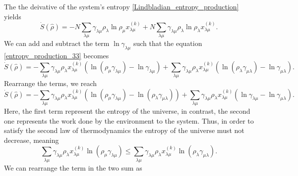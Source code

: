 The the deivative of the system's entropy \eqref{Lindbladian_entropy_production} yields 
\begin{equation}\label{entropy_production_33}
    \dot S(\hat\rho) = -N \sum_{\lambda\mu}\gamma_{\lambda\mu}\rho_\lambda\ln\rho_\mu x^{(k)}_{\lambda\mu} + N\sum_{\lambda\mu}\gamma_{\lambda\mu}\rho_\lambda\ln\rho_\lambda x^{(k)}_{\lambda\mu}.
\end{equation}
We can add and subtract the term $\ln\gamma_{\lambda\mu}$ such that the equation \eqref{entropy_production_33} becomes
\begin{equation}
    \dot S(\hat\rho) = -\sum_{\lambda\mu}\gamma_{\lambda\mu}\rho_\lambda x^{(k)}_{\lambda\mu}\left(\ln\left(\rho_\mu\gamma_{\lambda\mu}\right) - \ln\gamma_{\lambda\mu}\right)  
    + \sum_{\lambda\mu}\gamma_{\lambda\mu}\rho_\lambda x^{(k)}_{\lambda\mu}\left(\ln\left(\rho_\lambda\gamma_{\mu\lambda}\right)- \ln\gamma_{\mu\lambda}\right) .
\end{equation}
Rearrange the terms, we reach
\begin{equation}
    \dot S(\hat\rho) =-\sum_{\lambda\mu}\gamma_{\lambda\mu}\rho_\lambda x^{(k)}_{\lambda\mu}\left(\ln\left(\rho_\mu\gamma_{\lambda\mu}\right) - \ln\left(\rho_\lambda\gamma_{\mu\lambda}\right)\right) + \sum_{\lambda\mu}\gamma_{\lambda\mu}\rho_\lambda x^{(k)}_{\lambda\mu}\left(\ln\gamma_{\lambda\mu} - \ln\gamma_{\mu\lambda}\right).
\end{equation}
Here, the first term represent the entropy of the universe, in contrast, the second one represents the work done by the environment to the system.
Thus, in order to satisfy the second law of thermodynamics the entropy of the universe must not decrease, meaning
\begin{equation}
    \sum_{\lambda\mu}\gamma_{\lambda\mu}\rho_\lambda x^{(k)}_{\lambda\mu}\ln\left(\rho_\mu\gamma_{\lambda\mu}\right) \leq \sum_{\lambda\mu}\gamma_{\lambda\mu}\rho_\lambda x^{(k)}_{\lambda\mu}\ln\left(\rho_\lambda\gamma_{\mu\lambda}\right).
\end{equation}
We can rearrange the term in the two sum as

